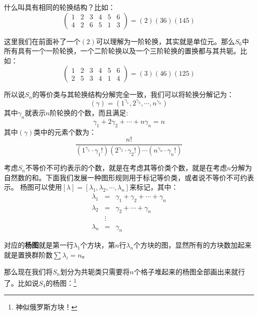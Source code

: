 什么叫具有相同的轮换结构？比如：
\begin{equation}
	\begin{pmatrix}
		1&2  & 3&4&5 &6 \\
		4& 2 & 6&5&1&3 
	\end{pmatrix}=(2)(36)(145)
\end{equation}

这里我们在前面补了一个$(2)$可以理解为一阶轮换，其实就是单位元。那么$S_6$中所有具有一个一阶轮换，一个二阶轮换以及一个三阶轮换的置换都与其共轭。比如：
\begin{equation}
	\begin{pmatrix}
		1&2  & 3&4&5 &6 \\
		2& 5 & 3&4&1&4 
	\end{pmatrix}=(3)(46)(125)
\end{equation}

所以说$S_n$的等价类与其轮换结构分解完全一致，我们可以将轮换分解记为：
\[(\gamma)=\left(1^{\gamma_1},2^{\gamma_2},\cdots,n^{\gamma_n}\right)\]
其中$\gamma_n$就表示$n$阶轮换的个数，而且满足:
\[\gamma_1+2\gamma_2+\cdots+n\gamma_n=n\]
其中$(\gamma)$类中的元素个数为：
\[\frac{n!}{(1^{\gamma_1}\cdot\gamma_1!)(2^{\gamma_2}\cdot\gamma_2!)\cdots (n^{\gamma_n}\cdot\gamma_n!)}\]

考虑$S_n$不等价不可约表示的个数，就是在考虑其等价类个数，就是在考虑$n$分解为自然数的和。下面我们发展一种图形规则用于标记等价类，或者说不等价不可约表示。
杨图可以使用$[\lambda]=\left[\lambda_{1},\lambda_{2},\cdots,\lambda_n\right]$来标记，其中：
\begin{equation}
	\begin{aligned}
		\lambda_{1}&=&\gamma_1+\gamma_2+\cdots+\gamma_n\\
		\lambda_{2}&=&\gamma_2+\cdots+\gamma_n\\
		&\vdots&\\
		\lambda_n&=&\gamma_n
	\end{aligned}
\end{equation}

对应的\textbf{杨图}就是第一行$\lambda_1$个方块，第$n$行$\lambda_n$个方块的图，显然所有的方块数加起来就是置换群阶数$\sum \lambda_i=n$。

那么现在我们将$S_n$划分为共轭类只需要将$n$个格子堆起来的杨图全部画出来就行了。比如说$S_4$的杨图：\footnote{神似俄罗斯方块！}

\begin{center}
\quad\quad{}\quad\quad{}\quad\quad{}\quad\quad{}
\end{center}

